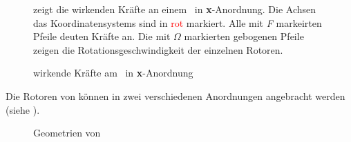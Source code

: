 \begin{figure}[ht!]
\vspace{0.25cm}
\begin{center}
\caption{wirkende Kräfte am \Quad\ in \textbf{x}-Anordnung }
\label{fig:Forces}
\end{center}

\vspace{0.25cm}
 zeigt die wirkenden Kräfte an einem \Quad\ in \textbf{x}-Anordnung. Die Achsen das Koordinatensystems sind in \textcolor{red}{rot} markiert. Alle mit \textit{F} markeirten Pfeile deuten Kräfte an. Die mit $\Omega$ markierten gebogenen Pfeile zeigen die Rotationsgeschwindigkeit der einzelnen Rotoren.
\end{figure}


Die Rotoren von \Quad[n] können in zwei verschiedenen Anordnungen angebracht werden (siehe ).

\begin{figure}[ht!]
\vspace{0.25cm}
\begin{center}
\caption{Geometrien von \Quad[n] \cite{Paper1}}
\label{fig:Geom}
\end{center}

\vspace{0.25cm}
\end{figure}


